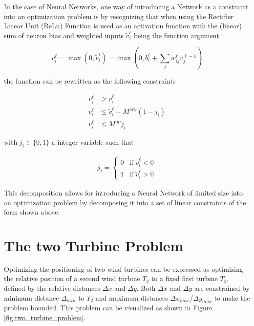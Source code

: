 In the case of Neural Networks, one way of introducing a Network as a constraint into an optimization problem is by recognizing that when using the Rectifier Linear Unit (ReLu) Function is used as an activation function with the (linear) sum of neuron bias and weighted inputs $\tilde{v}_i^\ell$ being the function argument


\begin{equation}
	v_i^\ell = \max(0, \tilde{v}_i^\ell) = \max(0,  b_i^\ell + \sum_j w_{ij}^\ell v_j^{\ell - 1})
\end{equation}


the function can be rewritten as the following constraints 

\begin{align}
	v_i^\ell &\geq \tilde{v}_i^\ell \\
	v_i^\ell &\leq \tilde{v}_i^\ell - M^{\text{low}}(1 - j_i) \\
	v_i^\ell &\leq M^{\text{up}} j_i
\end{align}

with $j_i \in \{0,1\}$ a integer variable such that

\begin{align}
	j_i =
	\begin{cases}
		0 & \text{if } \tilde{v}_i^\ell < 0 \\
		1 & \text{if } \tilde{v}_i^\ell > 0
	\end{cases}
\end{align}

This decomposition allows for introducing a Neural Network of limited size into an optimization problem by decomposing it into a set of linear constraints of the form shown above. \cite{ALCANTARA2023120895}

\section{The two Turbine Problem}

Optimizing the positioning of two wind turbines can be expressed as optimizing the relative position of a second wind turbine $T_2$ to a fixed first turbine $T_2$, defined by the relative distances $\Delta x$ and  $\Delta y$. Both  $\Delta x$ and  $\Delta y$ are constrained by minimum distance $\Delta_{min}$ to  $T_2$ and maximum distances $\Delta x_{max}$/$\Delta y_{max}$ to make the problem bounded. 
This problem can be visualized as shown in Figure \ref{fig:two_turbine_problem}.

